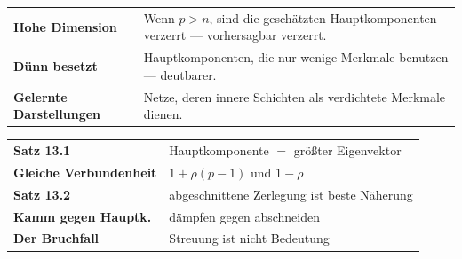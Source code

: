 \begin{forschung}
\begin{center}
{\small
\renewcommand{\arraystretch}{1.45}
\begin{tabular}{@{}P{2.8cm}P{5.4cm}@{}}
\toprule
\textbf{Hohe Dimension} & Wenn $p > n$, sind die geschätzten Hauptkomponenten verzerrt --- vorhersagbar verzerrt.\\
\textbf{Dünn besetzt} & Hauptkomponenten, die nur wenige Merkmale benutzen --- deutbarer.\\
\textbf{Gelernte Darstellungen} & Netze, deren innere Schichten als verdichtete Merkmale dienen.\\
\bottomrule
\end{tabular}}
\end{center}

\begin{center}
\begin{minipage}{0.88\textwidth}
\end{minipage}
\end{center}
\end{forschung}

\begin{merksatz}
\begin{center}
\renewcommand{\arraystretch}{1.5}
\begin{tabular}{@{}P{3.0cm}P{5.6cm}@{}}
\toprule
\textbf{Satz 13.1} & Hauptkomponente $=$ größter Eigenvektor\\
\textbf{Gleiche Verbundenheit} & $1+\rho(p-1)$ und $1-\rho$\\
\textbf{Satz 13.2} & abgeschnittene Zerlegung ist beste Näherung\\
\textbf{Kamm gegen Hauptk.} & dämpfen gegen abschneiden\\
\textbf{Der Bruchfall} & Streuung ist nicht Bedeutung\\
\bottomrule
\end{tabular}
\end{center}

\begin{center}
\begin{minipage}{0.88\textwidth}
\end{minipage}
\end{center}
\end{merksatz}
